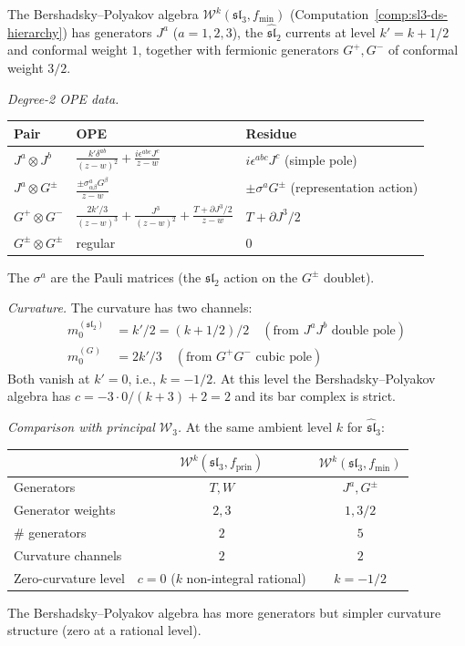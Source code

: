 \begin{computation}
\label{comp:bp-bar}

The Bershadsky--Polyakov algebra $\mathcal{W}^k(\mathfrak{sl}_3,
f_{\min})$ (Computation~\ref{comp:sl3-ds-hierarchy}) has generators $J^a$ ($a = 1, 2, 3$), the $\widehat{\mathfrak{sl}}_2$ currents at level $k' = k + 1/2$ and conformal weight $1$, together with fermionic generators $G^+, G^-$ of conformal weight $3/2$.

\emph{Degree-2 OPE data.}
\begin{center}
\renewcommand{\arraystretch}{1.2}
\begin{tabular}{lll}
\textbf{Pair} & \textbf{OPE} & \textbf{Residue} \\
\hline
$J^a \otimes J^b$ &
$\frac{k' \delta^{ab}}{(z-w)^2} + \frac{i\epsilon^{abc}J^c}{z-w}$ &
$i\epsilon^{abc}J^c$ (simple pole) \\[4pt]
$J^a \otimes G^\pm$ &
$\frac{\pm \sigma^a_{\alpha\beta} G^\beta}{z-w}$ &
$\pm \sigma^a G^\pm$ (representation action) \\[4pt]
$G^+ \otimes G^-$ &
$\frac{2k'/3}{(z-w)^3} + \frac{J^3}{(z-w)^2}
+ \frac{T + \partial J^3/2}{z-w}$ &
$T + \partial J^3/2$ \\[4pt]
$G^\pm \otimes G^\pm$ & regular & $0$
\end{tabular}
\end{center}
The $\sigma^a$ are the Pauli matrices (the $\mathfrak{sl}_2$ action
on the $G^\pm$ doublet).

\emph{Curvature.}
The curvature has two channels:
\begin{align}
m_0^{(\mathfrak{sl}_2)} &= k'/2 = (k+1/2)/2
\quad (\text{from } J^a J^b \text{ double pole})
\label{eq:bp-curv-sl2} \\
m_0^{(G)} &= 2k'/3
\quad (\text{from } G^+ G^- \text{ cubic pole})
\label{eq:bp-curv-G}
\end{align}
Both vanish at $k' = 0$, i.e., $k = -1/2$.  At this level the
Bershadsky--Polyakov algebra has $c = -3 \cdot 0/(k+3) + 2 = 2$
and its bar complex is strict.

\emph{Comparison with principal $\mathcal{W}_3$.}
At the same ambient level $k$ for $\widehat{\mathfrak{sl}}_3$:
\begin{center}
\renewcommand{\arraystretch}{1.2}
\begin{tabular}{l|cc}
& $\mathcal{W}^k(\mathfrak{sl}_3, f_{\mathrm{prin}})$ &
$\mathcal{W}^k(\mathfrak{sl}_3, f_{\min})$ \\
\hline
Generators & $T, W$ & $J^a, G^\pm$ \\
Generator weights & $2, 3$ & $1, 3/2$ \\
$\#$ generators & $2$ & $5$ \\
Curvature channels & $2$ & $2$ \\
Zero-curvature level & $c = 0$ ($k$ non-integral rational) & $k = -1/2$
\end{tabular}
\end{center}
The Bershadsky--Polyakov algebra has more generators but simpler
curvature structure (zero at a rational level).
\end{computation}


